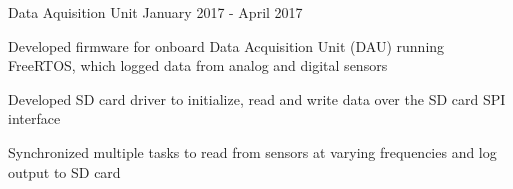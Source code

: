 \begin{cventries}
  \cventrythree
    {}
    {Data Aquisition Unit} %
    {} %
    {January 2017 - April 2017} %
    {
      \begin{cvitems} %
        \item {Developed firmware for onboard Data Acquisition Unit (DAU) running FreeRTOS, which logged data from analog and digital sensors}
        \item {Developed SD card driver to initialize, read and write data over the SD card SPI interface}
        \item {Synchronized multiple tasks to read from sensors at varying frequencies and log output to SD card}
      \end{cvitems}
    }


\end{cventries}
